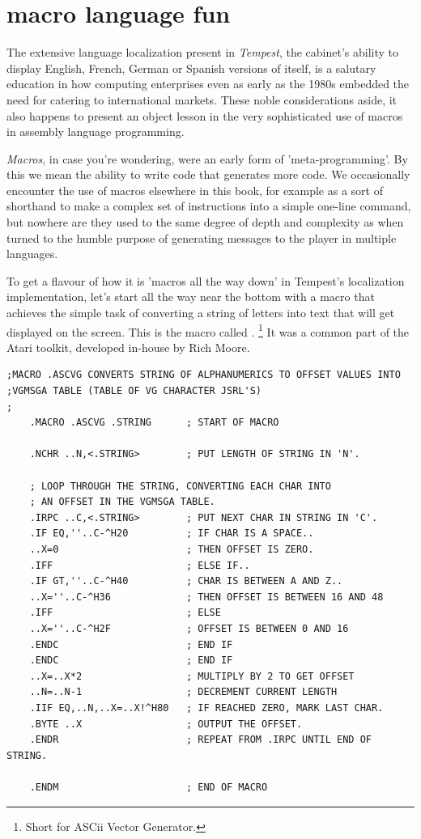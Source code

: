 \chapter{macro language fun}
\label{sec:language}
\lstset{style=6502Style}
\lhead[tempest]{}

The extensive language localization present in \textit{Tempest}, the cabinet's
ability to display English, French, German or Spanish versions of itself, is a
salutary education in how computing enterprises even as early as the 1980s
embedded the need for catering to international markets. These noble
considerations aside, it also happens to present an object lesson in the very
sophisticated use of macros in assembly language programming.

\textit{Macros}, in case you're wondering, were an early form of 'meta-programming'.
By this we mean the ability to write code that generates more code. We occasionally
encounter the use of macros elsewhere in this book, for example as a sort of shorthand
to make a complex set of instructions into a simple one-line command, but nowhere are they used to the
same degree of depth and complexity as when turned to the humble purpose of generating
messages to the player in multiple languages.

To get a flavour of how it is 'macros all the way down' in Tempest's localization implementation,
let's start all the way near the bottom with a macro that achieves the simple task of converting
a string of letters into text that will get displayed on the screen. This is the macro called
.
\footnote{Short for ASCii Vector Generator.}
It was a common part of the Atari toolkit, developed in-house by Rich Moore.

\clearpage

\begin{lstlisting}
;MACRO .ASCVG CONVERTS STRING OF ALPHANUMERICS TO OFFSET VALUES INTO
;VGMSGA TABLE (TABLE OF VG CHARACTER JSRL'S)
;
    .MACRO .ASCVG .STRING      ; START OF MACRO

    .NCHR ..N,<.STRING>        ; PUT LENGTH OF STRING IN 'N'.

    ; LOOP THROUGH THE STRING, CONVERTING EACH CHAR INTO
    ; AN OFFSET IN THE VGMSGA TABLE.
    .IRPC ..C,<.STRING>        ; PUT NEXT CHAR IN STRING IN 'C'.
    .IF EQ,''..C-^H20          ; IF CHAR IS A SPACE..
    ..X=0                      ; THEN OFFSET IS ZERO.
    .IFF                       ; ELSE IF..
    .IF GT,''..C-^H40          ; CHAR IS BETWEEN A AND Z..
    ..X=''..C-^H36             ; THEN OFFSET IS BETWEEN 16 AND 48
    .IFF                       ; ELSE
    ..X=''..C-^H2F             ; OFFSET IS BETWEEN 0 AND 16
    .ENDC                      ; END IF
    .ENDC                      ; END IF
    ..X=..X*2                  ; MULTIPLY BY 2 TO GET OFFSET
    ..N=..N-1                  ; DECREMENT CURRENT LENGTH
    .IIF EQ,..N,..X=..X!^H80   ; IF REACHED ZERO, MARK LAST CHAR.
    .BYTE ..X                  ; OUTPUT THE OFFSET.
    .ENDR                      ; REPEAT FROM .IRPC UNTIL END OF STRING.

    .ENDM                      ; END OF MACRO
\end{lstlisting}

